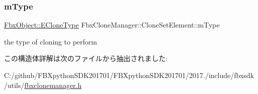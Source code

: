 \subsubsection{\texorpdfstring{m\+Type}{mType}}
{\footnotesize\ttfamily \hyperlink{class_fbx_object_a9f5626b2d2135684d6ea1e6e4ad2acbb}{Fbx\+Object\+::\+E\+Clone\+Type} Fbx\+Clone\+Manager\+::\+Clone\+Set\+Element\+::m\+Type}



the type of cloning to perform 



この構造体詳解は次のファイルから抽出されました\+:\begin{DoxyCompactItemize}
\item 
C\+:/github/\+F\+B\+Xpython\+S\+D\+K201701/\+F\+B\+Xpython\+S\+D\+K201701/2017./include/fbxsdk/utils/\hyperlink{fbxclonemanager_8h}{fbxclonemanager.\+h}\end{DoxyCompactItemize}
